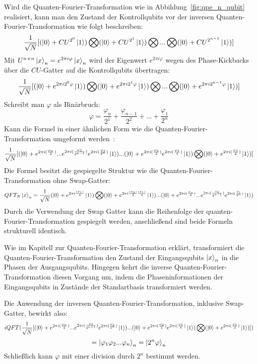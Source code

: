 Wird die Quanten-Fourier-Transformation wie in Abbildung~\ref{fig:qpe_n_qubit} realisiert,
kann man den Zustand der Kontrollqubits vor der inversen Quanten-Fourier-Transformation wie folgt beschreiben:
\[\frac{1}{\sqrt{N}}[
  (\ket{0} + CU^{2^0}\ket{1}) \bigotimes
  (\ket{0} + CU^{2^1}\ket{1}) \bigotimes 
  ... \bigotimes
  (\ket{0} + CU^{2^{n-1}}\ket{1}) 
]\]
Mit \(U^{n\times n}\ket{x}_n=e^{2\pi i \varphi}\ket{x}_n\) wird der Eigenwert \(e^{2\pi i \varphi}\) wegen des Phase-Kickbacks
über die \(CU\)-Gatter auf die Kontrollqubits übertragen:
\[\frac{1}{\sqrt{N}}[
  (\ket{0} + e^{2\pi i 2^0 \varphi}\ket{1}) \bigotimes
  (\ket{0} + e^{2\pi i 2^1 \varphi}\ket{1}) \bigotimes 
  ... \bigotimes
  (\ket{0} + e^{2\pi i 2^{n-1} \varphi}\ket{1}) 
]\]
Schreibt man \(\varphi\) als Binärbruch:
\[\varphi = \frac{\varphi_n}{2^1} + \frac{\varphi_{n-1}}{2^2} + ... + \frac{\varphi_1}{2^n}\]
Kann die Formel in einer ähnlichen Form wie die Quanten-Fourier-Transformation umgeformt werden~\cite{nielsen_chuang_2010}:
\[\frac{1}{\sqrt{N}}[
  (\ket{0} + e^{2\pi i (\frac{\varphi_n}{2})} ... e^{2\pi i (\frac{\varphi_2}{2^{n-1}})}e^{2\pi i (\frac{\varphi_1}{2^{n}})}\ket{1})  ... 
  (\ket{0} +  e^{2\pi i (\frac{\varphi_2}{2})}e^{2\pi i (\frac{\varphi_1}{4})}\ket{1}) \bigotimes 
  (\ket{0} + e^{2\pi i (\frac{\varphi_1}{2})}\ket{1}) 
]\]
Die Formel besitzt die gespiegelte Struktur wie die Quanten-Fourier-Transformation ohne Swap-Gatter:
\[QFT_{N}\ket{x}_{n} = \frac{1}{\sqrt{N}}(\ket{0} + { e^{2 \pi i \frac{(x_1)}{2}}}\ket{1}) \bigotimes
( \ket{0} + { e^{2 \pi i \frac{(x_2)}{2}\frac{(x_1)}{4}}}\ket{1})...
(\ket{0} + e^{2\pi i (\frac{x_n}{2})} ... e^{2\pi i (\frac{x_2}{2^{n-1}})}e^{2\pi i (\frac{x_1}{2^{n}})}\ket{1})\]
Durch die Verwendung der Swap Gatter kann die Reihenfolge der quanten-Fourier-Transformation gespiegelt werden, 
anschließend sind beide Formeln strukturell identisch.

Wie im Kapitell zur Quanten-Fourier-Transformation erklärt,
transformiert die Quanten-Fourier-Transformation den Zustand der Eingangsqubits \(\ket{x}_n\) in die Phasen der Ausgangsqubits.
Hingegen kehrt die inverse Quanten-Fourier-Transformation diesen Vorgang um, 
indem die Phaseninformationen der Eingangsqubits in Zustände der Standartbasis transformiert werden.

Die Anwendung der inversen Quanten-Fourier-Transformation, inklusive Swap-Gatter, bewirkt also:
\[iQFT(\frac{1}{\sqrt{N}}[
  (\ket{0} + e^{2\pi i (\frac{\varphi_n}{2})} ... e^{2\pi i (\frac{\varphi_2}{2^{n-1}})}e^{2\pi i (\frac{\varphi_1}{2^{n}})}\ket{1})  ... 
  (\ket{0} +  e^{2\pi i (\frac{\varphi_2}{2})}e^{2\pi i (\frac{\varphi_1}{4})}\ket{1}) \bigotimes 
  (\ket{0} + e^{2\pi i (\frac{\varphi_1}{2})}\ket{1}) 
])\]
\[ = \ket{\varphi_1 \varphi_{2}...\varphi_n}_n = \ket{2^n\varphi}_n\]
Schließlich kann \(\varphi\) mit einer division durch \(2^n\) bestimmt werden.

